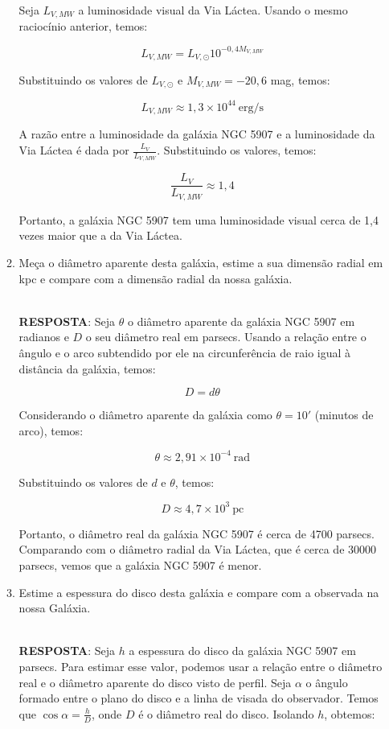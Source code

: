 \documentclass[a4paper,12pt]{article}
\begin{document}
\begin{enumerate}
\begin{enumerate}
Seja $L_{V,MW}$ a luminosidade visual da Via Láctea. Usando o mesmo raciocínio anterior, temos:

$$
L_{V,MW} = L_{V,\odot} 10^{-0,4 M_{V,MW}}
$$

Substituindo os valores de $L_{V,\odot}$ e $M_{V,MW} = -20,6$ mag, temos:

$$
L_{V,MW} \approx 1,3 \times 10^{44}~\text{erg/s}
$$

A razão entre a luminosidade da galáxia NGC 5907 e a luminosidade da Via Láctea é dada por $\frac{L_V}{L_{V,MW}}$. Substituindo os valores, temos:

$$
\frac{L_V}{L_{V,MW}} \approx 1,4
$$

Portanto, a galáxia NGC 5907 tem uma luminosidade visual cerca de 1,4 vezes maior que a da Via Láctea.

\noindent\hrulefill

\item Meça o diâmetro aparente desta galáxia, estime a sua dimensão radial em kpc e compare com a dimensão radial da nossa galáxia.

\noindent\hrulefill\\\textbf{RESPOSTA}: Seja $\theta$ o diâmetro aparente da galáxia NGC 5907 em radianos e $D$ o seu diâmetro real em parsecs. Usando a relação entre o ângulo e o arco subtendido por ele na circunferência de raio igual à distância da galáxia, temos:

$$
D = d \theta
$$

Considerando o diâmetro aparente da galáxia como $\theta = 10'$ (minutos de arco), temos:

$$
\theta \approx 2,91 \times 10^{-4}~\text{rad}
$$

Substituindo os valores de $d$ e $\theta$, temos:

$$
D \approx 4,7 \times 10^3~\text{pc}
$$

Portanto, o diâmetro real da galáxia NGC 5907 é cerca de 4700 parsecs. Comparando com o diâmetro radial da Via Láctea, que é cerca de 30000 parsecs, vemos que a galáxia NGC 5907 é menor.

\noindent\hrulefill

\item Estime a espessura do disco desta galáxia e compare com a observada na nossa Galáxia.

\noindent\hrulefill\\\textbf{RESPOSTA}: Seja $h$ a espessura do disco da galáxia NGC 5907 em parsecs. Para estimar esse valor, podemos usar a relação entre o diâmetro real e o diâmetro aparente do disco visto de perfil. Seja $\alpha$ o ângulo formado entre o plano do disco e a linha de visada do observador. Temos que $\cos \alpha = \frac{h}{D}$, onde $D$ é o diâmetro real do disco. Isolando $h$, obtemos:


\end{enumerate}
\end{enumerate}
\end{document}

